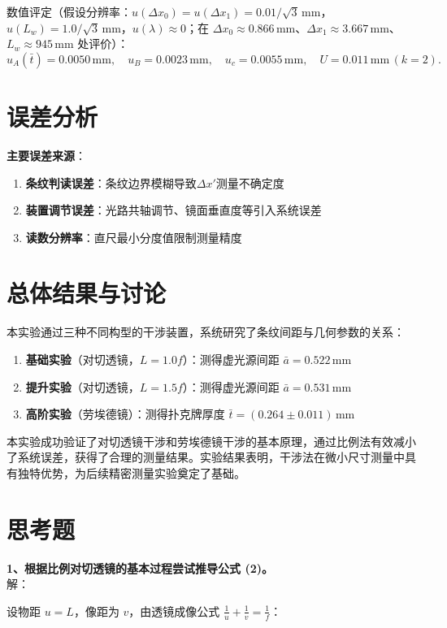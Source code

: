 \documentclass[12pt,a4paper]{article}
\begin{document}
\noindent 数值评定（假设分辨率：$u(\Delta x_0)=u(\Delta x_1)=0.01/\sqrt{3}\,\mathrm{mm}$，$u(L_w)=1.0/\sqrt{3}\,\mathrm{mm}$，$u(\lambda)\approx0$；在 $\Delta x_0\approx0.866\,\mathrm{mm}$、$\Delta x_1\approx3.667\,\mathrm{mm}$、$L_w\approx945\,\mathrm{mm}$ 处评价）：
\[ u_A(\bar t)=0.0050\,\mathrm{mm},\quad u_B=0.0023\,\mathrm{mm},\quad u_c=0.0055\,\mathrm{mm},\quad U=0.011\,\mathrm{mm}\,(k=2). \]

\section{误差分析}
\textbf{主要误差来源}：
\begin{enumerate}
    \item \textbf{条纹判读误差}：条纹边界模糊导致$\Delta x'$测量不确定度
    \item \textbf{装置调节误差}：光路共轴调节、镜面垂直度等引入系统误差
    \item \textbf{读数分辨率}：直尺最小分度值限制测量精度
\end{enumerate}


\section{总体结果与讨论}
本实验通过三种不同构型的干涉装置，系统研究了条纹间距与几何参数的关系：

\begin{enumerate}
    \item \textbf{基础实验}（对切透镜，$L = 1.0f$）：测得虚光源间距 $\bar{a} = 0.522 \, \text{mm}$
    \item \textbf{提升实验}（对切透镜，$L = 1.5f$）：测得虚光源间距 $\bar{a} = 0.531 \, \text{mm}$  
    \item \textbf{高阶实验}（劳埃德镜）：测得扑克牌厚度 $\bar{t} = (0.264 \pm 0.011) \, \text{mm}$
\end{enumerate}

本实验成功验证了对切透镜干涉和劳埃德镜干涉的基本原理，通过比例法有效减小了系统误差，获得了合理的测量结果。实验结果表明，干涉法在微小尺寸测量中具有独特优势，为后续精密测量实验奠定了基础。


\appendix
\section{思考题}
\textbf{1、根据比例对切透镜的基本过程尝试推导公式 (2)。}\\
解：

设物距 $u = L$，像距为 $v$，由透镜成像公式 $\frac{1}{u} + \frac{1}{v} = \frac{1}{f}$：
\end{document}
